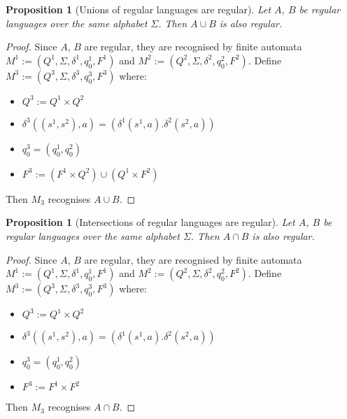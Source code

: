 \documentclass{article}
\theoremstyle{break}
\newtheorem{proposition}[theorem]{Proposition}
\begin{document}
\begin{proposition}[Unions of regular languages are regular]
\label{prop:union-of-regular-languages-regular}
Let $A$, $B$ be regular languages over the same alphabet $\Sigma$. 
Then $A\cup B$ is also regular.
\end{proposition}

\begin{proof}
\label{prf:union-of-regular-languages-regular}
Since $A$, $B$ are regular, they are recognised by finite automata $M^1:=(Q^1,\Sigma,\delta^1,q^1_0,F^1)$ and $M^2:=(Q^2,\Sigma,\delta^2,q^2_0,F^2)$.
Define $M^3:=(Q^3,\Sigma,\delta^3,q^3_0,F^3)$ where:
\begin{itemize}
  \item $Q^3 := Q^1 \times Q^2$
  \item $\delta^3((s^1, s^2), a) = (\delta^1(s^1,a). \delta^2(s^2, a))$
  \item $q^3_0 = (q^1_0, q^2_0)$
  \item $F^3 := \left(F^1\times Q^2\right) \cup \left(Q^1\times F^2\right)$
\end{itemize}
Then $M_3$ recognises $A\cup B$.
\end{proof}

\begin{proposition}[Intersections of regular languages are regular]
\label{prop:intersection-of-regular-languages-regular}
  Let $A$, $B$ be regular languages over the same alphabet $\Sigma$. 
  Then $A\cap B$ is also regular.
\end{proposition}

\begin{proof}
\label{prf:intersection-of-regular-languages-regular}
  Since $A$, $B$ are regular, they are recognised by finite automata $M^1:=(Q^1,\Sigma,\delta^1,q^1_0,F^1)$ and $M^2:=(Q^2,\Sigma,\delta^2,q^2_0,F^2)$.
  Define $M^3:=(Q^3,\Sigma,\delta^3,q^3_0,F^3)$ where:
  \begin{itemize}
    \item $Q^3 := Q^1 \times Q^2$
    \item $\delta^3((s^1, s^2), a) = (\delta^1(s^1,a). \delta^2(s^2, a))$
    \item $q^3_0 = (q^1_0, q^2_0)$
    \item $F^3 := F^1\times F^2$
  \end{itemize}
  Then $M_3$ recognises $A\cap B$.
\end{proof}
\end{document}

